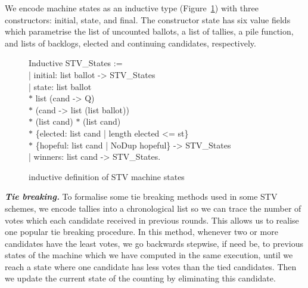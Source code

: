 \documentclass{llncs}
\begin{document}
We encode machine states as an inductive type (Figure~\ref{fig;fig.1})
with three constructors: {\selectfont initial},
{\selectfont state}, and {\selectfont
  final}. The constructor {\selectfont state} has six
value fields which parametrise the list of uncounted ballots, a list
of tallies, a pile function, and lists of backlogs, elected and continuing candidates, respectively.\\
\begin{scriptsize}
\begin{figure}[t]
{\selectfont
Inductive STV\_States :=\\
   \hspace*{0.33cm} | initial:
     list ballot -> STV\_States \\
  \hspace*{0.5cm}| state:                                   
\hspace*{0.1cm}  list ballot     \\                   
     \hspace*{2.0cm}$*$ list (cand -> Q)     \\           
     \hspace*{2.0cm}$*$ (cand -> list (list ballot)) \\        
     \hspace*{2.0cm}$*$ (list cand) $*$ (list cand)               \\      
     \hspace*{2.0cm}$*$ \{elected: list cand | length  elected <= st\} \\  
     \hspace*{2.0cm}$*$ \{hopeful: list cand | NoDup hopeful\}         
     -> STV\_States\\
  \hspace*{0.5cm}| winners:                 
    list cand -> STV\_States.       
}
\caption{inductive definition of STV machine states}
\label{fig;fig.1}
\end{figure}
\end{scriptsize}
\textbf{\emph{Tie breaking.}} To formalise some tie breaking methods
used in some STV schemes, we encode tallies into a chronological list so
we can trace the number of votes which each
candidate received in previous rounds. This allows us to realise one popular tie
breaking procedure. In this method, whenever two or more
candidates have the least votes, we go backwards stepwise, if need be,
to previous states of the machine which we have computed in the same
execution, until we reach a state where one candidate has less votes
than the tied candidates. Then we update the current state of the counting by eliminating this candidate.   
\end{document}
